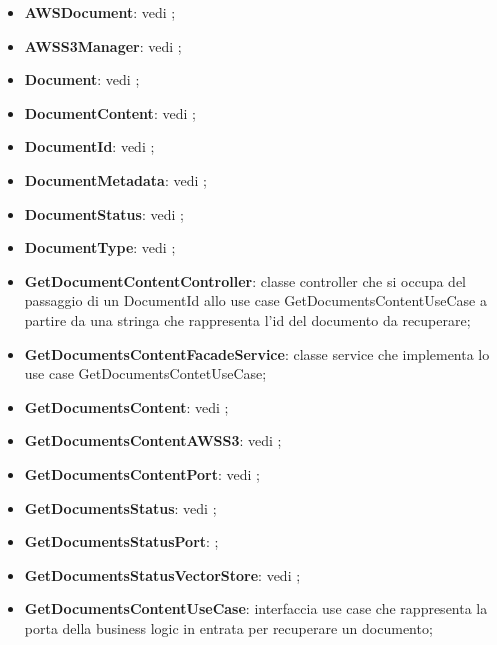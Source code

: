 \documentclass[10pt, a4paper]{article}
\begin{document}
\begin{itemize}
    \item \textbf{AWSDocument}: vedi ;
    \item \textbf{AWSS3Manager}: vedi ;
    \item \textbf{Document}: vedi ;
    \item \textbf{DocumentContent}: vedi ;
    \item \textbf{DocumentId}: vedi ;
    \item \textbf{DocumentMetadata}: vedi ;
    \item \textbf{DocumentStatus}: vedi ;
    \item \textbf{DocumentType}: vedi ;
    \item \label{GetDocumentContentController}\textbf{GetDocumentContentController}: classe controller che si occupa del passaggio di un DocumentId allo use case GetDocumentsContentUseCase a partire da una stringa che rappresenta l'id del documento da recuperare;
    \item \label{GetDocumentsContentFacadeService}\textbf{GetDocumentsContentFacadeService}: classe service che implementa lo use case GetDocumentsContetUseCase;
    \item \textbf{GetDocumentsContent}: vedi ;
    \item \textbf{GetDocumentsContentAWSS3}: vedi ;
    \item \textbf{GetDocumentsContentPort}: vedi ;
    \item \textbf{GetDocumentsStatus}: vedi ;
    \item \textbf{GetDocumentsStatusPort}: ;
    \item \textbf{GetDocumentsStatusVectorStore}: vedi ;
    \item \label{GetDocumentsContentUseCase}\textbf{GetDocumentsContentUseCase}: interfaccia use case che rappresenta la porta della business logic in entrata per recuperare un documento;

\end{itemize}
\end{document}
